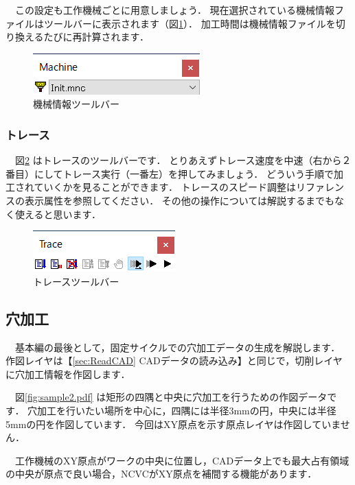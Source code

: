 \vspace*{2zh}
　この設定も工作機械ごとに用意しましょう．
現在選択されている機械情報ファイルはツールバーに表示されます（図\ref{fig:select.png}）．
加工時間は機械情報ファイルを切り換えるたびに再計算されます．

\begin{figure}[H]
\centering
\includegraphics{No2/fig/select.png}
\caption{機械情報ツールバー}
\label{fig:select.png}
\end{figure}

\subsubsection{トレース}

　図\ref{fig:trace.png} はトレースのツールバーです．
とりあえずトレース速度を中速（右から２番目）にしてトレース実行（一番左）を押してみましょう．
どういう手順で加工されていくかを見ることができます．
トレースのスピード調整はリファレンスの表示属性を参照してください．
その他の操作については解説するまでもなく使えると思います．

\begin{figure}[H]
\centering
\includegraphics{No2/fig/trace.png}
\caption{トレースツールバー}
\label{fig:trace.png}
\end{figure}

\subsection{穴加工}

　基本編の最後として，固定サイクルでの穴加工データの生成を解説します．
作図レイヤは【\ref{sec:ReadCAD} CADデータの読み込み】と同じで，切削レイヤに穴加工情報を作図します．

　図\ref{fig:sample2.pdf} は矩形の四隅と中央に穴加工を行うための作図データです．
穴加工を行いたい場所を中心に，四隅には半径3mmの円，中央には半径5mmの円を作図しています．
今回はXY原点を示す原点レイヤは作図していません．

　工作機械のXY原点がワークの中央に位置し，CADデータ上でも最大占有領域の中央が原点で良い場合，NCVCがXY原点を補間する機能があります．

